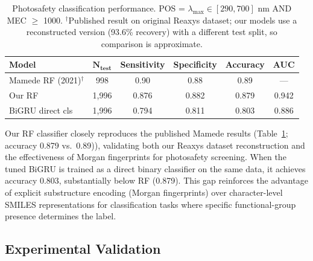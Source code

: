 \documentclass[journal=jcisd8,manuscript=article]{achemso}
\newcommand{\added}[1]{{\color{addedblue}#1}}
\newcommand{\removed}[1]{{\color{removedred}#1}}
\begin{document}
\begin{table}[htbp]
\centering
\caption{Photosafety classification performance. POS = $\lambda_{\max} \in [290,700]$ nm AND MEC $\geq$ 1000. $^\dagger$Published result on original Reaxys dataset; our models use a reconstructed version (93.6\% recovery) with a different test split, so comparison is approximate.}
\label{tab:classification}
\begin{tabular}{lccccc}
\toprule
\textbf{Model} & $\boldsymbol{N_{\text{test}}}$ & \textbf{Sensitivity} & \textbf{Specificity} & \textbf{Accuracy} & \textbf{AUC} \\
\midrule
Mamede RF (2021)$^\dagger$ & 998 & 0.90 & 0.88 & 0.89 & --- \\
Our RF & 1,996 & 0.876 & 0.882 & 0.879 & 0.942 \\
BiGRU direct cls & 1,996 & 0.794 & 0.811 & 0.803 & 0.886 \\
\bottomrule
\end{tabular}
\end{table}

Our RF classifier closely reproduces the published Mamede results\added{ (Table~\ref{tab:classification};} accuracy 0.879 vs.\ 0.89\removed{)}\added{)}, validating both our Reaxys dataset reconstruction and the effectiveness of Morgan fingerprints for photosafety screening.
When the tuned BiGRU is trained as a direct binary classifier on the same data, it achieves accuracy 0.803, substantially below RF (0.879).
This gap reinforces the advantage of explicit substructure encoding (Morgan fingerprints) over character-level SMILES representations for classification tasks where specific functional-group presence determines the label.


\subsection{Experimental Validation}
\label{sec:experimental}
\end{document}
